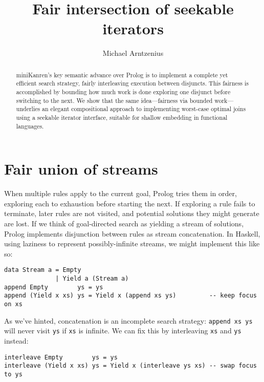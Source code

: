 \documentclass[acmsmall,screen,review,anonymous,dvipsnames,svgnames]{acmart}
\title{Fair intersection of seekable iterators}
\author{Michael Arntzenius}
\affiliation{%
	\institution{UC Berkeley}
	\city{Berkeley}
	\state{CA}
	\country{USA}
}
\newcommand\ttt\texttt
\begin{document}
\begin{abstract}
  miniKanren's key semantic advance over Prolog is to implement a complete yet efficient search strategy, fairly interleaving execution between disjuncts.
  This fairness is accomplished by bounding how much work is done exploring one disjunct before switching to the next.
  We show that the same idea---fairness via bounded work---underlies an elegant compositional approach to implementing worst-case optimal joins using a seekable iterator interface, suitable for shallow embedding in functional languages.
\end{abstract}

\maketitle

\section{Fair union of streams}

When multiple rules apply to the current goal, Prolog tries them in order, exploring each to exhaustion before starting the next.
If exploring a rule fails to terminate, later rules are not visited, and potential solutions they might generate are lost.
If we think of goal-directed search as yielding a stream of solutions, Prolog implements disjunction between rules as stream concatenation.
In Haskell, using laziness to represent possibly-infinite streams, we might implement this like so:

\begin{verbatim}
data Stream a = Empty
              | Yield a (Stream a)
append Empty        ys = ys
append (Yield x xs) ys = Yield x (append xs ys)         -- keep focus on xs
\end{verbatim}

\noindent
As we've hinted, concatenation is an incomplete search strategy: \ttt{append xs ys} will never visit \ttt{ys} if \ttt{xs} is infinite.
We can fix this by interleaving \ttt{xs} and \ttt{ys} instead:

\begin{verbatim}
interleave Empty        ys = ys
interleave (Yield x xs) ys = Yield x (interleave ys xs) -- swap focus to ys
\end{verbatim}
\end{document}
